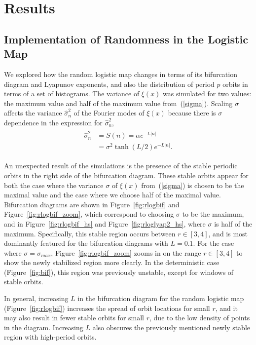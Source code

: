 \chapter{Results}
\section{Implementation of Randomness in the Logistic Map}
We explored how the random logistic map changes in terms of its
bifurcation diagram and Lyapunov exponents, and also the distribution
of period $p$ orbits in terms of a set of histograms. The variance of
$\xi(x)$ was simulated for two values: the maximum value and
half of the maximum value from~(\ref{sigma}). Scaling $\sigma$ affects
the variance $\hat{\sigma}_n^2$ of the Fourier modes of $\xi(x)$
because there is $\sigma$ dependence in the expression for $\hat{\sigma}_n^2$,
\begin{align*}
\begin{split}
\hat{\sigma}_n^2 &= S(n) = \alpha e^{-L|n|}\\
&= \sigma^2 \tanh(L/2) e^{-L|n|}.
\end{split}
\end{align*}

An unexpected result of the simulations is the presence of the stable
periodic orbits in the right side of the bifurcation diagram. These
stable orbits appear for both the case where the variance $\sigma$ of
$\xi(x)$ from~(\ref{sigma}) is chosen to be the maximal value and the
case where we choose half of the maximal
value. Bifurcation diagrams are shown in Figure~\ref{fig:rlogbif} and
Figure~\ref{fig:rlogbif_zoom}, which correspond to choosing $\sigma$
to be the maximum, and in Figure~\ref{fig:rlogbif_hs} and
Figure~\ref{fig:rloglyap2_hs}, where $\sigma$ is half
of the maximum. Specifically, this stable region occurs between $r\in
[3,4]$, and is most dominantly featured for the bifurcation
diagrams with $L=0.1$. For the case where $\sigma=\sigma_{max}$, Figure~\ref{fig:rlogbif_zoom} zooms in on the
range $r \in [3,4]$ to show the newly stabilized region more clearly. In the
deterministic case (Figure~\ref{fig:bif}), this region was previously
unstable, except for windows of stable orbits. 

In general, increasing $L$ in the bifurcation diagram for the random
logistic map (Figure~\ref{fig:rlogbif}) increases the spread of orbit
locations for small $r$, and it may also result in fewer stable orbits
for small $r$, due to the low density of points in the
diagram. Increasing $L$ also obscures the previously mentioned newly
stable region with high-period orbits.


